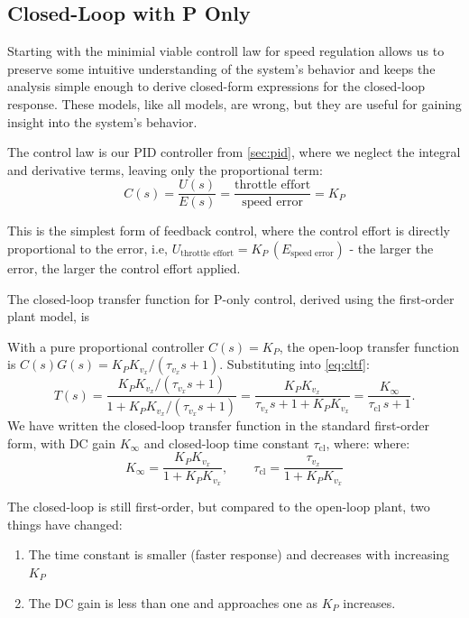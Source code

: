 \documentclass[12pt]{article}
\begin{document}
\subsection{Closed-Loop with P Only}

Starting with the minimial viable controll law for speed regulation allows us to preserve some intuitive understanding of the system's behavior and keeps the analysis simple enough to derive closed-form expressions for the closed-loop response.    These models, like all models, are wrong, but they are useful for gaining insight into the system's behavior.

The control law is our PID controller from \cref{sec:pid}, where we neglect the integral and derivative terms, leaving only the proportional term:
\[
C(s) = \frac{U(s)}{E(s)} = \frac{\text{throttle effort}}{\text{speed error}} = K_P
\]

This is the simplest form of feedback control, where the control effort is directly proportional to the error, i.e, $U_\text{throttle effort} = K_P \, (E_\text{speed error})$ - the larger the error, the larger the control effort applied.

The closed-loop transfer function for P-only control, derived using the first-order plant model, is



With a pure proportional controller $C(s) = K_P$, the open-loop transfer
function is $C(s)G(s) = K_P K_{v_x}/(\tau_{v_x} s + 1)$.  Substituting into
\cref{eq:cltf}:
\begin{equation}
  T(s) = \frac{K_P K_{v_x}/(\tau_{v_x} s+1)}{1 + K_P K_{v_x}/(\tau_{v_x} s+1)}
          = \frac{K_P K_{v_x}}{\tau_{v_x} s + 1 + K_P K_{v_x}}
          = \frac{K_\infty}{\tau_\mathrm{cl}\,s + 1}.
  \label{eq:cl_p}
\end{equation}
We have written the closed-loop transfer function in the standard first-order form, with DC gain $K_\infty$ and closed-loop time constant $\tau_\mathrm{cl}$, where:
where:
\begin{equation}
  K_\infty = \frac{K_P K_{v_x}}{1 + K_P K_{v_x}}, \qquad
  \tau_\mathrm{cl} = \frac{\tau_{v_x}}{1 + K_P K_{v_x}}
  \label{eq:p_params}
\end{equation}

The closed-loop is still first-order, but compared to the open-loop plant, two things have
changed: 

\begin{enumerate}
\item The time constant is smaller (faster response) and decreases with increasing $K_P$
\item The DC gain is less than one and approaches one as $K_P$ increases.
\end{enumerate}
\end{document}
